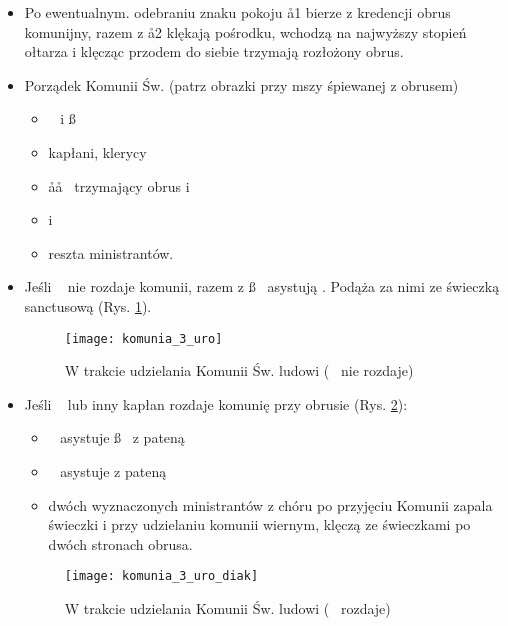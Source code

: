 			\begin{itemize}
				\item Po ewentualnym. odebraniu znaku pokoju \aa1 bierze z kredencji obrus komunijny, razem z \aa2 klękają pośrodku, wchodzą na najwyższy stopień ołtarza i klęcząc przodem do siebie trzymają rozłożony obrus.
				\item Porządek Komunii Św. (patrz obrazki przy mszy śpiewanej z obrusem)
					\begin{itemize}
						\item \dd~ i \ss~
						\item kapłani, klerycy
						\item \aa\aa~ trzymający obrus i 
						\item {} i \tt~
						\item reszta ministrantów.
					\end{itemize}
				\item Jeśli \dd~ nie rozdaje komunii, razem z \ss~ asystują \ii. Podąża za nimi  ze świeczką sanctusową (Rys. \ref{fig:komunia_3_uro}).
				
					\begin{figure}[h]
						\centering
						\texttt{[image: komunia\_3\_uro]}
						\caption{W trakcie udzielania Komunii Św. ludowi (\dd~ nie rozdaje)}
						\label{fig:komunia_3_uro}
					\end{figure}
				
				\item Jeśli \dd~ lub inny kapłan rozdaje komunię przy obrusie (Rys. \ref{fig:komunia_3_uro_1}):
					\begin{itemize}
						\item \ii~ asystuje \ss~ z pateną
						\item \dd~ asystuje  z pateną
						\item dwóch wyznaczonych ministrantów z chóru po przyjęciu Komunii zapala świeczki i przy udzielaniu komunii wiernym, klęczą ze świeczkami po dwóch stronach obrusa.
					\end{itemize}
				
					\begin{figure}[ht]
						\centering
						\texttt{[image: komunia\_3\_uro\_diak]}
						\caption{W trakcie udzielania Komunii Św. ludowi (\dd~ rozdaje)}
						\label{fig:komunia_3_uro_1}
					\end{figure}
				
			\end{itemize}
	
	\clearpage
 